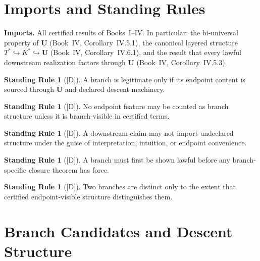 \documentclass[12pt,oneside]{amsbook}
\theoremstyle{plain}
\theoremstyle{definition}
\newtheorem{standingrule}[theorem]{Standing Rule}
\theoremstyle{remark}
\newcommand{\status}[1]{\textup{[#1]}}
\begin{document}
\section{Imports and Standing Rules}

\textbf{Imports.}  All certified results of Books~I--IV.  In
particular: the bi-universal property of $\mathbf{U}$
(Book~IV, Corollary~IV.5.1), the canonical layered structure
$T^* \hookrightarrow K^* \hookrightarrow \mathbf{U}$
(Book~IV, Corollary~IV.6.1), and the result that every lawful
downstream realization factors through $\mathbf{U}$
(Book~IV, Corollary~IV.5.3).

\begin{standingrule}[\status{D}]\label{sr:source-descent-only}
A branch is legitimate only if its endpoint content is sourced through
$\mathbf{U}$ and declared descent machinery.
\end{standingrule}

\begin{standingrule}[\status{D}]\label{sr:endpoint-visibility}
No endpoint feature may be counted as branch structure unless it is
branch-visible in certified terms.
\end{standingrule}

\begin{standingrule}[\status{D}]\label{sr:no-hidden-supplementation}
A downstream claim may not import undeclared structure under the guise
of interpretation, intuition, or endpoint convenience.
\end{standingrule}

\begin{standingrule}[\status{D}]\label{sr:legitimacy-before-closure}
A branch must first be shown lawful before any branch-specific closure
theorem has force.
\end{standingrule}

\begin{standingrule}[\status{D}]\label{sr:distinctness-by-endpoint}
Two branches are distinct only to the extent that certified
endpoint-visible structure distinguishes them.
\end{standingrule}

\section{Branch Candidates and Descent Structure}
\end{document}
